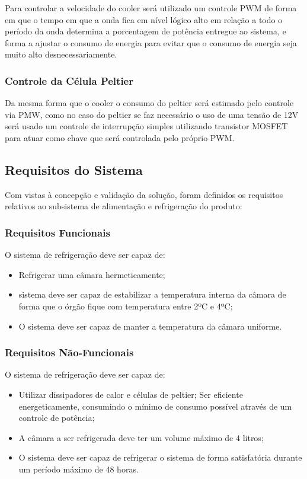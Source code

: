 Para controlar a velocidade do cooler será utilizado um controle PWM de forma em que o tempo em que a onda fica em nível lógico alto em relação a todo o período da onda determina a porcentagem de potência entregue ao sistema, e forma a ajustar o consumo de energia para evitar que o consumo de energia seja muito alto desnecessariamente.

\subsubsection{Controle da Célula Peltier}

Da mesma forma que  o cooler o consumo do peltier será estimado pelo controle via PMW, como no caso do peltier se faz necessário o uso de uma tensão de 12V será usado um controle de interrupção simples utilizando transistor MOSFET para atuar como chave que será controlada pelo próprio PWM.

\subsection{Requisitos do Sistema}

Com vistas à concepção e validação da solução, foram definidos os requisitos relativos ao subsistema de alimentação e refrigeração do produto:

\subsubsection{Requisitos Funcionais}
O sistema de refrigeração deve ser capaz de:
\begin{itemize}
\item Refrigerar uma câmara hermeticamente;
\item sistema deve ser capaz de estabilizar a temperatura interna da câmara de forma que o órgão fique com temperatura entre 2ºC e 4ºC;
\item O sistema deve ser capaz de manter a temperatura da câmara uniforme.

\end{itemize}
\subsubsection{Requisitos Não-Funcionais}
O sistema de refrigeração deve ser capaz de:
\begin{itemize}
\item Utilizar dissipadores de calor e células de peltier;
Ser eficiente energeticamente, consumindo o mínimo de consumo possível através de um controle de potência;
\item A câmara a ser refrigerada deve ter um volume máximo de 4 litros;
\item O sistema deve ser capaz de refrigerar o sistema de forma satisfatória durante um período máximo de 48 horas.
\end{itemize}


